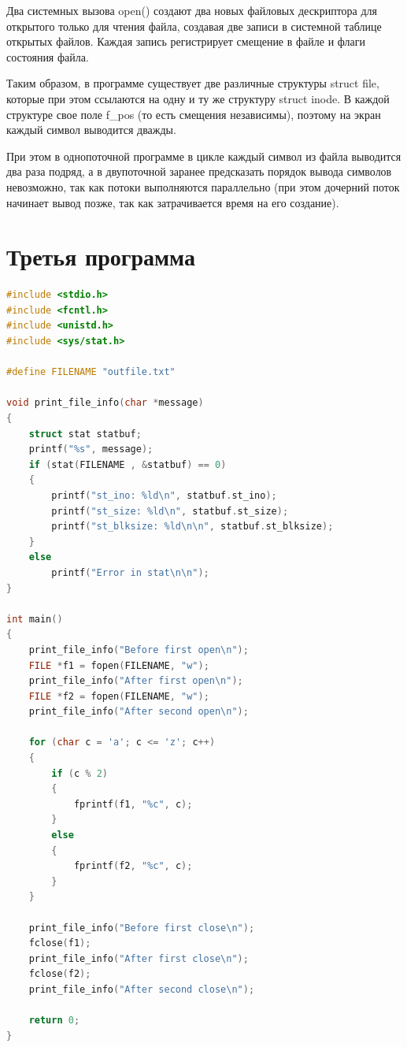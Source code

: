 \documentclass[12pt]{report}
\begin{document}
Два системных вызова open() создают два новых файловых дескриптора для открытого только для чтения файла, создавая две записи в системной таблице открытых файлов. Каждая запись регистрирует смещение в файле и флаги состояния файла. 

Таким образом, в программе существует две различные структуры struct file, которые при этом ссылаются на одну и ту же структуру struct inode. В каждой структуре свое поле f\_pos (то есть смещения независимы), поэтому на экран каждый символ выводится дважды.

При этом в однопоточной программе в цикле каждый символ из файла выводится два раза подряд, а в двупоточной заранее предсказать порядок вывода символов невозможно, так как потоки выполняются параллельно (при этом дочерний поток начинает вывод позже, так как затрачивается время на его создание).






\chapter{Третья программа}


\begin{lstlisting}[language=c, label=p3, caption=Третья программа]
#include <stdio.h>
#include <fcntl.h>
#include <unistd.h>
#include <sys/stat.h>

#define FILENAME "outfile.txt"

void print_file_info(char *message)
{
    struct stat statbuf;
    printf("%s", message);
    if (stat(FILENAME , &statbuf) == 0)
    {
        printf("st_ino: %ld\n", statbuf.st_ino);
        printf("st_size: %ld\n", statbuf.st_size);
        printf("st_blksize: %ld\n\n", statbuf.st_blksize);
    }
    else
        printf("Error in stat\n\n");
}

int main()
{
    print_file_info("Before first open\n");
    FILE *f1 = fopen(FILENAME, "w");
    print_file_info("After first open\n");
    FILE *f2 = fopen(FILENAME, "w");
    print_file_info("After second open\n");

    for (char c = 'a'; c <= 'z'; c++)
    {
        if (c % 2)
        {
            fprintf(f1, "%c", c);
        }
        else
        {
            fprintf(f2, "%c", c);
        }
    }

    print_file_info("Before first close\n");
    fclose(f1);
    print_file_info("After first close\n");
    fclose(f2);
    print_file_info("After second close\n");

    return 0;
}

\end{lstlisting}
\end{document}
